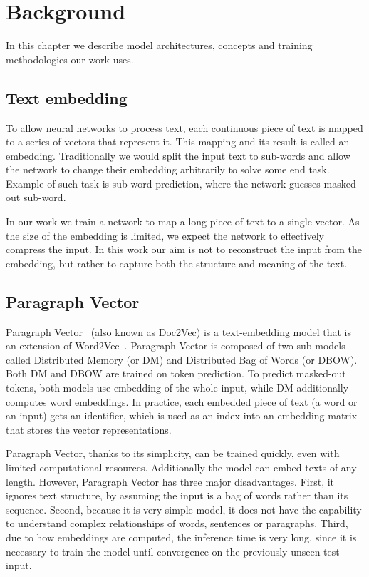 \chapter{Background}

In this chapter we describe model architectures, concepts and training
methodologies our work uses.


\section{Text embedding}

To allow neural networks to process text, each continuous piece of text is
mapped to a series of vectors that represent it. This mapping and its result is
called an embedding. Traditionally we would split the input text
to sub-words and allow the network to change their embedding arbitrarily to
solve some end task. Example of such task is sub-word prediction, where the
network guesses masked-out sub-word.

In our work we train a network to map a long piece of text to a single vector.
As the size of the embedding is limited, we expect the network to effectively
compress the input. In this work our aim is not to reconstruct the input from
the embedding, but rather to capture both the structure and meaning of the text.

\section{Paragraph Vector}

Paragraph Vector~\cite{le2014distributed} (also known as Doc2Vec) is a
text-embedding model that is an extension of
Word2Vec~\cite{mikolov2013efficient}. Paragraph Vector is composed of two
sub-models called Distributed Memory (or DM) and Distributed Bag of Words (or
DBOW). Both DM and DBOW are trained on token prediction. To predict masked-out
tokens, both models use embedding of the whole input, while DM additionally
computes word embeddings. In practice, each embedded piece of text (a word or
an input) gets an identifier, which is used as an index into an embedding
matrix that stores the vector representations.

Paragraph Vector, thanks to its simplicity, can be trained quickly, even with
limited computational resources. Additionally the model can embed texts of any
length. However, Paragraph Vector has three major disadvantages. First, it
ignores text structure, by assuming the input is a bag of words rather than its
sequence. Second, because it is very simple model, it does not have the
capability to understand complex relationships of words, sentences or
paragraphs. Third, due to how embeddings are computed, the inference time is
very long, since it is necessary to train the model until convergence on the
previously unseen test input.

